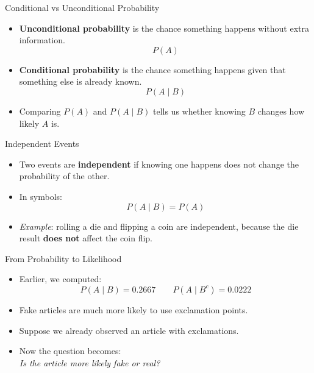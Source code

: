 \documentclass[12pt]{beamer}
\begin{document}
\begin{frame}{}
\begin{block}{Conditional vs Unconditional Probability}
\begin{itemize}
    \item \textbf{Unconditional probability} is the chance something happens without extra information.
    \[
    P(A)
    \]
    \item \textbf{Conditional probability} is the chance something happens given that something else is already known.
    \[
    P(A \mid B)
    \]
    \item Comparing \(P(A)\) and \(P(A \mid B)\) tells us whether knowing \(B\) changes how likely \(A\) is.
\end{itemize}
\end{block}
\end{frame}

\begin{frame}{}
\begin{block}{Independent Events}
\begin{itemize}
    \item Two events are \textbf{independent} if knowing one happens does not change the probability of the other.
    \item In symbols:
    \[
    P(A \mid B) = P(A)
    \]
    \item \textcolor{aggiemaroon!70}{\emph{Example}: rolling a die and flipping a coin are independent, because the die result \textbf{does not} affect the coin flip.}
\end{itemize}
\end{block}
\end{frame}

\begin{frame}{}
\begin{block}{From Probability to Likelihood}
\begin{itemize}
    \item Earlier, we computed:
    \[
    P(A \mid B)=0.2667
    \qquad
    P(A \mid B^c)=0.0222
    \]
    \item Fake articles are much more likely to use exclamation points.
    \item Suppose we already observed an article with exclamations.
    \item Now the question becomes:\\
          \centering \textit{Is the article more likely fake or real?}
\end{itemize}
\end{block}
\end{frame}
\end{document}
